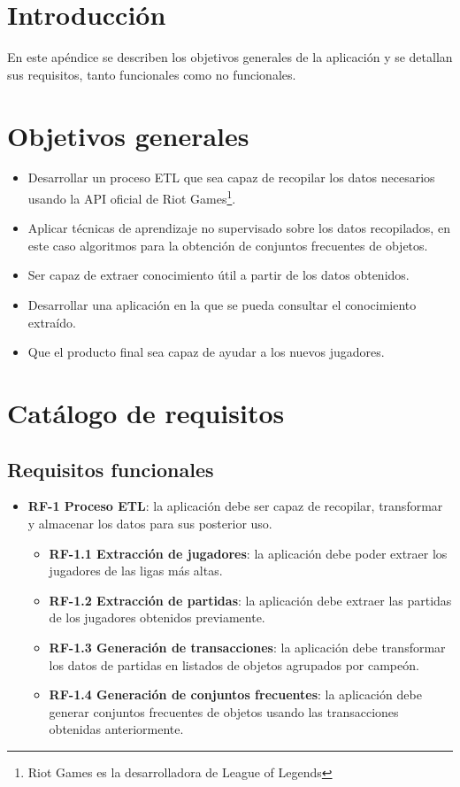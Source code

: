 
\section{Introducción}

En este apéndice se describen los objetivos generales de la aplicación y se detallan sus requisitos, tanto funcionales como no funcionales.

\section{Objetivos generales}
\begin{itemize}
    \item Desarrollar un proceso ETL que sea capaz de recopilar los datos necesarios usando la API oficial de Riot Games\footnote{Riot Games es la desarrolladora de League of Legends}.
	\item Aplicar técnicas de aprendizaje no supervisado sobre los datos recopilados, en este caso algoritmos para la obtención de conjuntos frecuentes de objetos.
	\item Ser capaz de extraer conocimiento útil a partir de los datos obtenidos.
	\item Desarrollar una aplicación en la que se pueda consultar el conocimiento extraído.
	\item Que el producto final sea capaz de ayudar a los nuevos jugadores.
\end{itemize}

\section{Catálogo de requisitos}
\subsection{Requisitos funcionales}
\begin{itemize}
	\item \textbf{RF-1 Proceso ETL}: la aplicación debe ser capaz de recopilar, transformar y almacenar los datos para sus posterior uso.
	\begin{itemize}
		\item \textbf{RF-1.1 Extracción de jugadores}: la aplicación debe poder extraer los jugadores de las ligas más altas.
		\item \textbf{RF-1.2 Extracción de partidas}: la aplicación debe extraer las partidas de los jugadores obtenidos previamente.
		\item \textbf{RF-1.3 Generación de transacciones}: la aplicación debe transformar los datos de partidas en listados de objetos agrupados por campeón.
		\item \textbf{RF-1.4 Generación de conjuntos frecuentes}: la aplicación debe generar conjuntos frecuentes de objetos usando las transacciones obtenidas anteriormente.
	\end{itemize}
\end{itemize}

